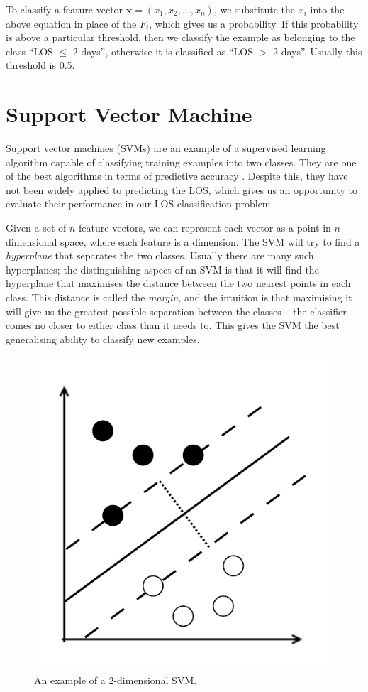 To classify a feature vector $\mathbf{x} = (x_1,x_2,\ldots,x_n)$, we substitute the
$x_i$ into the above equation in place of the $F_i$, which gives us a
probability. If this probability is above a particular threshold, then we
classify the example as belonging to the class ``LOS $\leq$ 2 days'', otherwise
it is classified as ``LOS $>$ 2 days''. Usually this threshold is 0.5.

\section{Support Vector Machine}
Support vector machines (SVMs) are an example of a supervised learning algorithm
capable of classifying training examples into two classes. They are one of the
best algorithms in terms of predictive accuracy \cite{Bellazzi2008}. Despite
this, they have not been widely applied to predicting the LOS, which gives us
an opportunity to evaluate their performance in our LOS classification problem.

Given a set of $n$-feature vectors, we can represent each vector as a point in
$n$-dimensional space, where each feature is a dimension. The SVM will try to
find a \textit{hyperplane} that separates the two classes. Usually there are
many such hyperplanes; the distinguishing aspect of an SVM is that it will
find the hyperplane that maximises the distance between the two nearest points
in each class. This distance is called the \textit{margin}, and the intuition
is that maximising it will give us the greatest possible separation between the
classes -- the classifier comes no closer to either class than it needs to.
This gives the SVM the best generalising ability to classify new examples.
\begin{figure}[h]
\includegraphics{images/method/svm-example.pdf}
\caption{An example of a 2-dimensional SVM.}
\label{fig:svm}
\end{figure}

